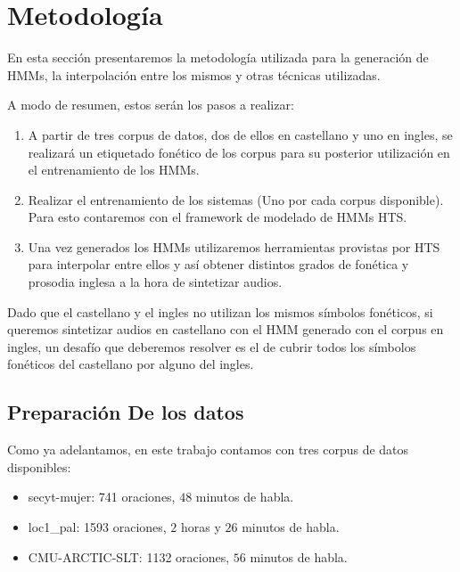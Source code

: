 \section{Metodología}

En esta sección presentaremos la metodología utilizada para la generación de HMMs, la interpolación entre los mismos y otras técnicas utilizadas.

A modo de resumen, estos serán los pasos a realizar:

\begin{enumerate}

\item A partir de tres corpus de datos, dos de ellos en castellano y uno en ingles, se realizará un etiquetado fonético de los corpus para su posterior utilización en el entrenamiento de los HMMs.

\item Realizar el entrenamiento de los sistemas (Uno por cada corpus disponible). Para esto contaremos con el framework de modelado de HMMs HTS. 

\item Una vez generados los HMMs utilizaremos herramientas provistas por HTS para interpolar entre ellos y así obtener distintos grados de fonética y prosodia inglesa a la hora de sintetizar audios.

\end{enumerate}

Dado que el castellano y el ingles no utilizan los mismos símbolos fonéticos, si queremos sintetizar audios en castellano con el HMM generado con el corpus en ingles, un desafío que deberemos resolver es el de cubrir todos los símbolos fonéticos del castellano por alguno del ingles.

\subsection{Preparación De los datos}

Como ya adelantamos, en este trabajo contamos con tres corpus de datos disponibles:

\begin{itemize}
\item secyt-mujer: 741 oraciones, $48$ minutos de habla.
\item loc1\_pal: 1593 oraciones, $2$ horas y $26$ minutos de habla.
\item CMU-ARCTIC-SLT: 1132 oraciones, $56$ minutos de habla.
\end{itemize}

